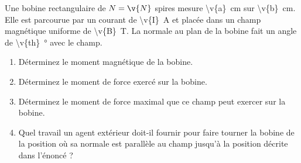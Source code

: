 Une bobine rectangulaire de $N = \v{N}$ spires mesure \qty{\v{a}}{cm} sur \qty{\v{b}}{cm}. Elle est parcourue par un courant de \qty{\v{I}}{A} et placée dans un champ magnétique uniforme de \qty{\v{B}}{T}. La normale au plan de la bobine fait un angle de \qty{\v{th}}{\degree} avec le champ.

\begin{enumerate}[label=\alph*)]
    \item Déterminez le moment magnétique de la bobine.
    \item Déterminez le moment de force exercé sur la bobine.
    \item Déterminez le moment de force maximal que ce champ peut exercer sur la bobine.
    \item Quel travail un agent extérieur doit-il fournir pour faire tourner la bobine de la position où sa normale est parallèle au champ jusqu'à la position décrite dans l'énoncé ?
\end{enumerate}
